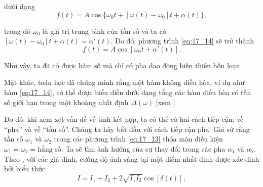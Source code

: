 \noindent
dưới dạng
\begin{equation*}
    f(t) = A \cos\{\omega_0 t + [\omega(t) - \omega_0] t + \alpha(t)\},
\end{equation*}

\noindent
trong đó $\omega_0$ là giá trị trung bình của tần số và ta có $[\omega(t) - \omega_0] t + \alpha(t) = \alpha'(t)$.
Do đó, phương trình \eqref{eq:17_14} sẽ trở thành
\begin{equation}\label{eq:17_15}
    f(t) = A \cos[\omega_0 t + \alpha'(t)].
\end{equation}

\noindent
Như vậy, ta đã có được hàm số mà chỉ có pha dao động biến thiên hỗn loạn.

Mặt khác, toán học đã chứng minh rằng một hàm không điều hòa, ví dụ như hàm \eqref{eq:17_14}, có thể được biểu diễn dưới dạng tổng các hàm điều hòa có tần số giới hạn trong một khoảng nhất định $\Delta(\omega)$ [xem ].

Do đó, khi xem xét vấn đề về tính kết hợp, ta có thể có hai cách tiếp cận: về ``pha'' và về ``tần số''.
Chúng ta hãy bắt đầu với cách tiếp cận pha.
Giả sử rằng tần số $\omega_1$ và $\omega_2$ trong các phương trình \eqref{eq:17_13} thỏa mãn điều kiện $\omega_1 = \omega_2 = \text{hằng số}$.
Ta sẽ tìm ảnh hưởng của sự thay đổi trong các pha $\alpha_1$ và $\alpha_2$.
Theo , với các giả định, cường độ ánh sáng tại một điểm nhất định được xác định bởi biểu thức
\begin{equation*}
    I = I_1 + I_2 + 2 \sqrt{I_1 I_2} \cos[\delta(t)],
\end{equation*}

